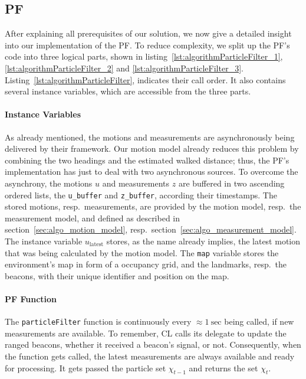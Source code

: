 \subsection{\acl{PF}}
After explaining all prerequisites of our solution, we now give a detailed insight into our implementation of the \acl{PF}. To reduce complexity, we split up the \acs{PF}'s code into three logical parts, shown in listing~\ref{lst:algorithmParticleFilter_1}, \ref{lst:algorithmParticleFilter_2} and \ref{lst:algorithmParticleFilter_3}. Listing~\ref{lst:algorithmParticleFilter}, indicates their call order. It also contains several instance variables, which are accessible from the three parts.


\paragraph{Instance Variables} As already mentioned, the motions and measurements are asynchronously being delivered by their framework. Our motion model already reduces this problem by combining the two headings and the estimated walked distance; thus, the \acs{PF}'s implementation has just to deal with two asynchronous sources. To overcome the asynchrony, the motions $u$ and measurements $z$ are buffered in two ascending ordered lists, the \texttt{u\_buffer} and \texttt{z\_buffer}, according their timestamps. The stored motions, resp.\ measurements, are provided by the motion model, resp.\ the measurement model, and defined as described in section~\ref{sec:algo_motion_model}, resp.\ section~\ref{sec:algo_measurement_model}. The instance variable $u_\text{latest}$ stores, as the name already implies, the latest motion that was being calculated by the motion model. The \texttt{map} variable stores the environment's map in form of a occupancy grid, and the landmarks, resp.\ the beacons, with their unique identifier and position on the map.

\paragraph{\acs{PF} Function} The \texttt{particleFilter} function is continuously every $\approx 1~\text{sec}$ being called, if new measurements are available. To remember, \ac{CL} calls its delegate to update the ranged beacons, whether it received a beacon's signal, or not. Consequently, when the function gets called, the latest measurements are always available and ready for processing. It gets passed the particle set $\chi_{t-1}$ and returns the set $\chi_t$.

